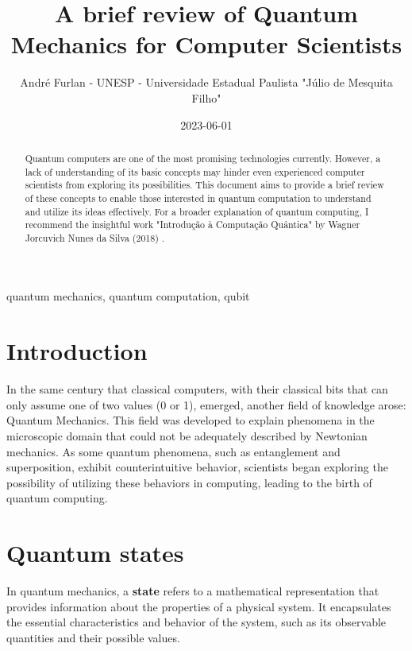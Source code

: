 


	\title{A brief review of Quantum Mechanics for Computer Scientists}
	\author{André Furlan - UNESP - Universidade Estadual Paulista "Júlio de Mesquita Filho"}
	\date{2023-06-01}
	\maketitle
	
	\begin{abstract}
		Quantum computers are one of the most promising technologies currently. However, a lack of understanding of its basic concepts may hinder even experienced computer scientists from exploring its possibilities. This document aims to provide a brief review of these concepts to enable those interested in quantum computation to understand and utilize its ideas effectively. For a broader explanation of quantum computing, I recommend the insightful work "Introdução à Computação Quântica" by Wagner Jorcuvich Nunes da Silva (2018) \cite{da2018introduccao}.
	\end{abstract}
	
	\begin{IEEEkeywords}
		quantum mechanics, quantum computation, qubit
	\end{IEEEkeywords}
	
	\section{Introduction}
		\par In the same century that classical computers, with their classical bits that can only assume one of two values (0 or 1), emerged, another field of knowledge arose: Quantum Mechanics. This field was developed to explain phenomena in the microscopic domain that could not be adequately described by Newtonian mechanics. As some quantum phenomena, such as entanglement and superposition, exhibit counterintuitive behavior, scientists began exploring the possibility of utilizing these behaviors in computing, leading to the birth of quantum computing.
		
	\section{Quantum states}
		\par In quantum mechanics, a \textbf{state} refers to a mathematical representation that provides information about the properties of a physical system. It encapsulates the essential characteristics and behavior of the system, such as its observable quantities and their possible values.\newline
		
